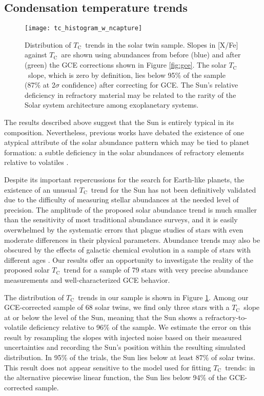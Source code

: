\documentclass[twocolumn]{aastex62}
\newcommand{\tc}{$T_\mathrm{C}$}
\newcommand{\acronym}[1]{{\small{#1}}}
\begin{document}
\vspace{5mm}

\subsection{Condensation temperature trends}

\begin{figure}
\centering
\texttt{[image: tc\_histogram\_w\_ncapture]}
\caption{Distribution of \tc\ trends in the solar twin sample. Slopes in [X/Fe] against \tc\ are shown using abundances from before (blue) and after (green) the \acronym{GCE} corrections shown in Figure \ref{fig:gce}. The solar \tc\ slope, which is zero by definition, lies below 95\% of the sample (87\% at 2$\sigma$ confidence) after correcting for \acronym{GCE}. The Sun's relative deficiency in refractory material may be related to the rarity of the Solar system architecture among exoplanetary systems.}
\label{fig:tchist}
\end{figure}

The results described above suggest that the Sun is entirely typical in its composition. Nevertheless, previous works have debated the existence of one atypical attribute of the solar abundance pattern which may be tied to planet formation: a subtle deficiency in the solar abundances of refractory elements relative to volatiles \citep{melendez09, ramirez09, adibekyan14, nissen15}. 

Despite its important repercussions for the search for Earth-like planets, the existence of an unusual \tc\ trend for the Sun has not been definitively validated due to the difficulty of measuring stellar abundances at the needed level of precision.
The amplitude of the proposed solar abundance trend is much smaller than the sensitivity of most traditional abundance surveys, and it is easily overwhelmed by the systematic errors that plague studies of stars with even moderate differences in their physical parameters.
Abundance trends may also be obscured by the effects of galactic chemical evolution in a sample of stars with different ages \citep{adibekyan14, nissen15, spina16}. 
Our results offer an opportunity to investigate the reality of the proposed solar \tc\ trend for a sample of 79 stars with very precise abundance measurements and well-characterized \acronym{GCE} behavior.

The distribution of \tc\ trends in our sample is shown in Figure \ref{fig:tchist}. Among our \acronym{GCE}-corrected sample of 68 solar twins, we find only three stars with a \tc\ slope at or below the level of the Sun, meaning that the Sun shows a refractory-to-volatile deficiency relative to 96\% of the sample. 
We estimate the error on this result by resampling the slopes with injected noise based on their measured uncertainties and recording the Sun's position within the resulting simulated distribution. In 95\% of the trials, the Sun lies below at least 87\% of solar twins. This result does not appear sensitive to the model used for fitting \tc\ trends: in the alternative piecewise linear function, the Sun lies below 94\% of the \acronym{GCE}-corrected sample.
\end{document}
